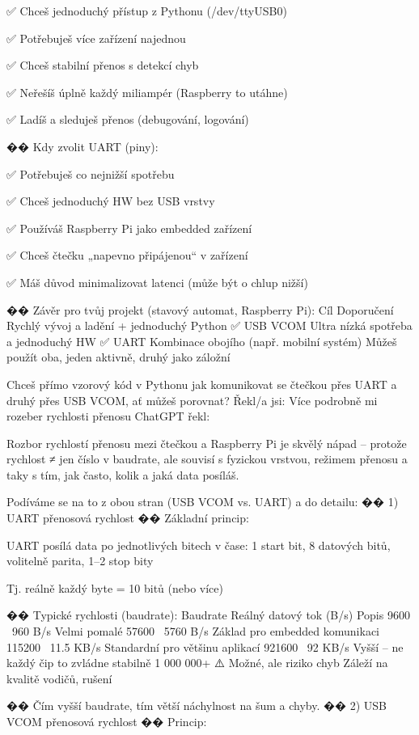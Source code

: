     ✅ Chceš jednoduchý přístup z Pythonu (/dev/ttyUSB0)

    ✅ Potřebuješ více zařízení najednou

    ✅ Chceš stabilní přenos s detekcí chyb

    ✅ Neřešíš úplně každý miliampér (Raspberry to utáhne)

    ✅ Ladíš a sleduješ přenos (debugování, logování)

�� Kdy zvolit UART (piny):

    ✅ Potřebuješ co nejnižší spotřebu

    ✅ Chceš jednoduchý HW bez USB vrstvy

    ✅ Používáš Raspberry Pi jako embedded zařízení

    ✅ Chceš čtečku „napevno připájenou“ v zařízení

    ✅ Máš důvod minimalizovat latenci (může být o chlup nižší)

�� Závěr pro tvůj projekt (stavový automat, Raspberry Pi):
Cíl	Doporučení
Rychlý vývoj a ladění + jednoduchý Python	✅ USB VCOM
Ultra nízká spotřeba a jednoduchý HW	✅ UART
Kombinace obojího (např. mobilní systém)	Můžeš použít oba, jeden aktivně, druhý jako záložní

Chceš přímo vzorový kód v Pythonu jak komunikovat se čtečkou přes UART a druhý přes USB VCOM, ať můžeš porovnat?
Řekl/a jsi:
Více podrobně mi rozeber rychlosti přenosu
ChatGPT řekl:

Rozbor rychlostí přenosu mezi čtečkou a Raspberry Pi je skvělý nápad – protože rychlost ≠ jen číslo v baudrate, ale souvisí s fyzickou vrstvou, režimem přenosu a taky s tím, jak často, kolik a jaká data posíláš.

Podíváme se na to z obou stran (USB VCOM vs. UART) a do detailu:
�� 1) UART přenosová rychlost
�� Základní princip:

    UART posílá data po jednotlivých bitech v čase: 1 start bit, 8 datových bitů, volitelně parita, 1–2 stop bity

    Tj. reálně každý byte = 10 bitů (nebo více)

�� Typické rychlosti (baudrate):
Baudrate	Reálný datový tok (B/s)	Popis
9600	~960 B/s	Velmi pomalé
57600	~5760 B/s	Základ pro embedded komunikaci
115200	~11.5 KB/s	Standardní pro většinu aplikací
921600	~92 KB/s	Vyšší – ne každý čip to zvládne stabilně
1 000 000+	⚠️ Možné, ale riziko chyb	Záleží na kvalitě vodičů, rušení

�� Čím vyšší baudrate, tím větší náchylnost na šum a chyby.
�� 2) USB VCOM přenosová rychlost
�� Princip:

